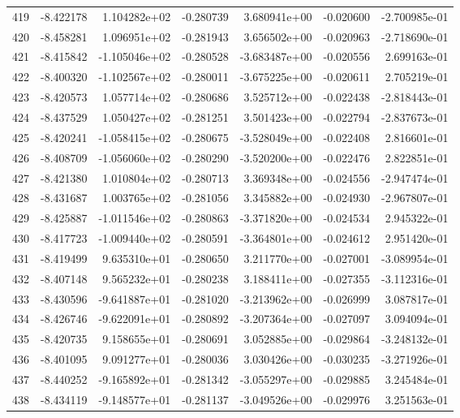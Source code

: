 \begin{tabular}{rrrrrrr}
 419 &  -8.422178 &  1.104282e+02 & -0.280739 &  3.680941e+00 &   -0.020600 & -2.700985e-01 \\
 420 &  -8.458281 &  1.096951e+02 & -0.281943 &  3.656502e+00 &   -0.020963 & -2.718690e-01 \\
 421 &  -8.415842 & -1.105046e+02 & -0.280528 & -3.683487e+00 &   -0.020556 &  2.699163e-01 \\
 422 &  -8.400320 & -1.102567e+02 & -0.280011 & -3.675225e+00 &   -0.020611 &  2.705219e-01 \\
 423 &  -8.420573 &  1.057714e+02 & -0.280686 &  3.525712e+00 &   -0.022438 & -2.818443e-01 \\
 424 &  -8.437529 &  1.050427e+02 & -0.281251 &  3.501423e+00 &   -0.022794 & -2.837673e-01 \\
 425 &  -8.420241 & -1.058415e+02 & -0.280675 & -3.528049e+00 &   -0.022408 &  2.816601e-01 \\
 426 &  -8.408709 & -1.056060e+02 & -0.280290 & -3.520200e+00 &   -0.022476 &  2.822851e-01 \\
 427 &  -8.421380 &  1.010804e+02 & -0.280713 &  3.369348e+00 &   -0.024556 & -2.947474e-01 \\
 428 &  -8.431687 &  1.003765e+02 & -0.281056 &  3.345882e+00 &   -0.024930 & -2.967807e-01 \\
 429 &  -8.425887 & -1.011546e+02 & -0.280863 & -3.371820e+00 &   -0.024534 &  2.945322e-01 \\
 430 &  -8.417723 & -1.009440e+02 & -0.280591 & -3.364801e+00 &   -0.024612 &  2.951420e-01 \\
 431 &  -8.419499 &  9.635310e+01 & -0.280650 &  3.211770e+00 &   -0.027001 & -3.089954e-01 \\
 432 &  -8.407148 &  9.565232e+01 & -0.280238 &  3.188411e+00 &   -0.027355 & -3.112316e-01 \\
 433 &  -8.430596 & -9.641887e+01 & -0.281020 & -3.213962e+00 &   -0.026999 &  3.087817e-01 \\
 434 &  -8.426746 & -9.622091e+01 & -0.280892 & -3.207364e+00 &   -0.027097 &  3.094094e-01 \\
 435 &  -8.420735 &  9.158655e+01 & -0.280691 &  3.052885e+00 &   -0.029864 & -3.248132e-01 \\
 436 &  -8.401095 &  9.091277e+01 & -0.280036 &  3.030426e+00 &   -0.030235 & -3.271926e-01 \\
 437 &  -8.440252 & -9.165892e+01 & -0.281342 & -3.055297e+00 &   -0.029885 &  3.245484e-01 \\
 438 &  -8.434119 & -9.148577e+01 & -0.281137 & -3.049526e+00 &   -0.029976 &  3.251563e-01 \\

\end{tabular}
